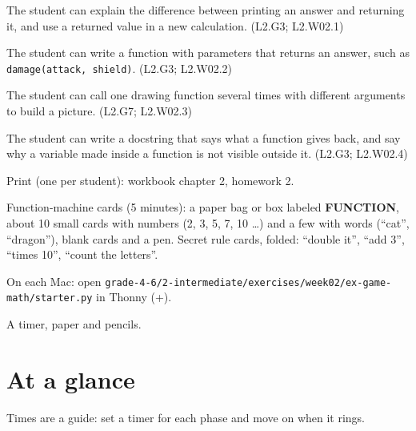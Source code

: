 
\begin{objectives}
  \item The student can explain the difference between printing an answer and returning it, and use a returned value in a new calculation. (L2.G3; L2.W02.1)
  \item The student can write a function with parameters that returns an answer, such as \texttt{damage(attack, shield)}. (L2.G3; L2.W02.2)
  \item The student can call one drawing function several times with different arguments to build a picture. (L2.G7; L2.W02.3)
  \item The student can write a docstring that says what a function gives back, and say why a variable made inside a function is not visible outside it. (L2.G3; L2.W02.4)
\end{objectives}

\begin{materials}
  \item Print (one per student): workbook chapter 2, homework 2.
  \item Function-machine cards (5 minutes): a paper bag or box labeled \textbf{FUNCTION}, about 10 small cards with numbers
        (2, 3, 5, 7, 10 \ldots) and a few with words (\enquote{cat}, \enquote{dragon}), blank cards and a pen.
        Secret rule cards, folded: \enquote{double it}, \enquote{add 3}, \enquote{times 10}, \enquote{count the letters}.
  \item On each Mac: open \texttt{grade-4-6/2-intermediate/exercises/week02/ex-game-math/starter.py} in Thonny (+).
  \item A timer, paper and pencils.
\end{materials}

\section{At a glance}
Times are a guide: set a timer for each phase and move on when it rings.
\begin{timeplan}
\end{timeplan}

